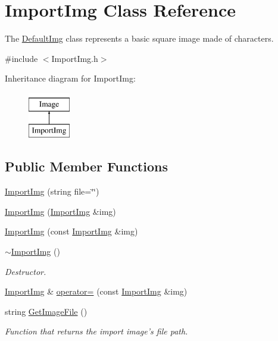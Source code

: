 \hypertarget{classImportImg}{\section{Import\-Img Class Reference}
\label{classImportImg}
}


The \hyperlink{classDefaultImg}{Default\-Img} class represents a basic square image made of characters.  




{\ttfamily \#include $<$Import\-Img.\-h$>$}

Inheritance diagram for Import\-Img\-:\begin{figure}[H]
\begin{center}
\leavevmode
\includegraphics[height=2.000000cm]{classImportImg}
\end{center}
\end{figure}
\subsection*{Public Member Functions}
\begin{DoxyCompactItemize}
\item 
\hyperlink{classImportImg_a888292aaf716935b9e6baddea62af5d8}{Import\-Img} (string file=\char`\"{}\char`\"{})
\item 
\hyperlink{classImportImg_a42a6d3113dfaa5c94fb43360d1641b6f}{Import\-Img} (\hyperlink{classImportImg}{Import\-Img} \&img)
\item 
\hyperlink{classImportImg_adfc26e250764e4388d9aee048a22a673}{Import\-Img} (const \hyperlink{classImportImg}{Import\-Img} \&img)
\item 
\hyperlink{classImportImg_a5b0782a45e30d935067919e69169e809}{$\sim$\-Import\-Img} ()
\begin{DoxyCompactList}\small\item\em Destructor. \end{DoxyCompactList}\item 
\hyperlink{classImportImg}{Import\-Img} \& \hyperlink{classImportImg_a3e162a2db0984d25d682c48108729da0}{operator=} (const \hyperlink{classImportImg}{Import\-Img} \&img)
\item 
string \hyperlink{classImportImg_ac6a2aaa21ea7cc5b439b292e809d3111}{Get\-Image\-File} ()
\begin{DoxyCompactList}\small\item\em Function that returns the import image's file path. \end{DoxyCompactList}\end{DoxyCompactItemize}
